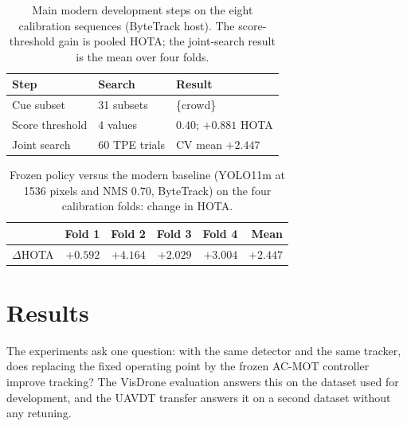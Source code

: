 \documentclass[journal]{new-aiaa}
\begin{document}
\begin{table}[htbp]
\caption{Main modern development steps on the eight calibration sequences
(ByteTrack host). The score-threshold gain is pooled HOTA; the joint-search
result is the mean over four folds.}
\label{tab:devrecord}
\centering\footnotesize
\setlength{\tabcolsep}{3pt}
\begin{tabular}{@{}lll@{}}
\toprule
Step & Search & Result\\
\midrule
Cue subset & 31 subsets & \{crowd\}\\
Score threshold & 4 values & 0.40; $+0.881$ HOTA\\
Joint search & 60 TPE trials & CV mean $+2.447$\\
\bottomrule
\end{tabular}
\end{table}

\begin{table}[htbp]
\caption{Frozen policy versus the modern baseline (YOLO11m at 1536 pixels and
NMS 0.70, ByteTrack) on the four calibration folds: change in HOTA.}
\label{tab:folds}
\centering\footnotesize
\begin{tabular}{@{}lrrrrr@{}}
\toprule
 & Fold 1 & Fold 2 & Fold 3 & Fold 4 & Mean\\
\midrule
$\Delta$HOTA & $+0.592$ & $+4.164$ & $+2.029$ & $+3.004$ & $+2.447$\\
\bottomrule
\end{tabular}
\end{table}
\section{Results}\label{sec:results}

The experiments ask one question: with the same detector and the same
tracker, does replacing the fixed operating point by the frozen AC-MOT
controller improve tracking? The VisDrone evaluation answers this on the
dataset used for development, and the UAVDT transfer answers it on a second
dataset without any retuning.
\end{document}
